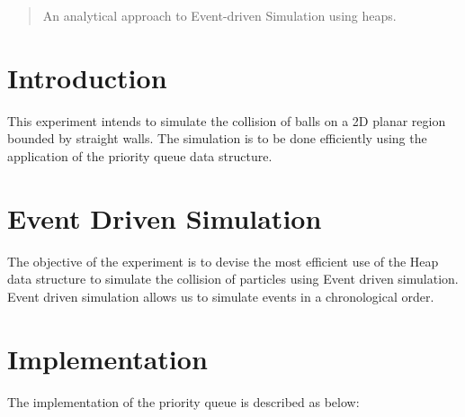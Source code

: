 \documentclass[12pt]{article}
\begin{document}
\maketitle

\begin{abstract}
An analytical approach to Event-driven Simulation using heaps.
\end{abstract}

\section{Introduction}
This experiment intends to simulate the collision of  balls on a 2D planar region bounded by straight walls. The simulation is to be done efficiently using the application of the priority queue data structure. \\

\section{Event Driven Simulation}
The objective of the experiment is to devise the most efficient use of the Heap data structure to simulate the collision of particles using Event driven simulation. \\
Event driven simulation allows us to simulate events in a chronological order.\\

\section{Implementation}\label{Implementation}
The implementation of the priority queue is described as below:\\
\end{document}
